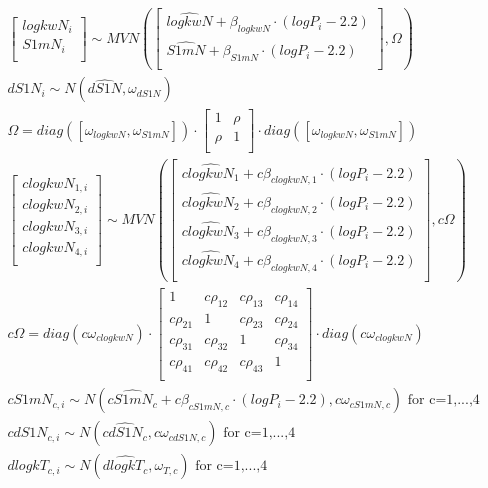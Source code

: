 \documentclass[
]{article}
\begin{document}
\[
\begin{aligned}
& \begin{bmatrix}
logkwN_i \\
S1mN_i\\
\end{bmatrix} \sim
MVN\left(\begin{bmatrix}
\widehat{logkwN}+\beta_{logkwN} \cdot (logP_i-2.2) \\
\widehat{S1mN}+\beta_{S1mN} \cdot (logP_i-2.2) \\
\end{bmatrix},  \Omega \right) \\
& dS1N_i \sim N(\widehat{dS1N}, \omega_{dS1N})\\
& \Omega =
diag([\omega_{logkwN},\omega_{S1mN}]) \cdot \begin{bmatrix}
 1 & \rho \\
 \rho & 1  \\
 \end{bmatrix} \cdot diag([\omega_{logkwN},\omega_{S1mN}]) \\
& \begin{bmatrix}
clogkwN_{1,i} \\
clogkwN_{2,i} \\
clogkwN_{3,i} \\
clogkwN_{4,i} \\
\end{bmatrix} \sim
MVN\left(\begin{bmatrix}
\widehat{clogkwN_1}+c\beta_{clogkwN,1} \cdot (logP_i-2.2) \\
\widehat{clogkwN_2}+c\beta_{clogkwN,2} \cdot (logP_i-2.2) \\
\widehat{clogkwN_3}+c\beta_{clogkwN,3} \cdot (logP_i-2.2) \\
\widehat{clogkwN_4}+c\beta_{clogkwN,4} \cdot (logP_i-2.2) \\
\end{bmatrix},  c\Omega \right) \\
& c\Omega =
diag(c\omega_{clogkwN}) \cdot \begin{bmatrix}
 1 & c\rho_{12} & c\rho_{13} & c\rho_{14} \\
  c\rho_{21} & 1 & c\rho_{23} & c\rho_{24} \\
   c\rho_{31} & c\rho_{32} & 1 & c\rho_{34} \\
   c \rho_{41} & c\rho_{42} & c\rho_{43} & 1 \\
 \end{bmatrix} \cdot diag(c\omega_{clogkwN}) \\
& cS1mN_{c,i} \sim N(\widehat{cS1mN_c}+c\beta_{cS1mN, c}\cdot (logP_i-2.2), c\omega_{cS1mN,c}) \text{ for c=1,...,4} \\
& cdS1N_{c,i} \sim N(\widehat{cdS1N_c}, c\omega_{cdS1N,c}) \text{ for c=1,...,4} \\
& dlogkT_{c,i} \sim N(\widehat{dlogkT_c},\omega_{T,c}) \text{ for c=1,...,4} \\
\end{aligned}
\]
\end{document}

